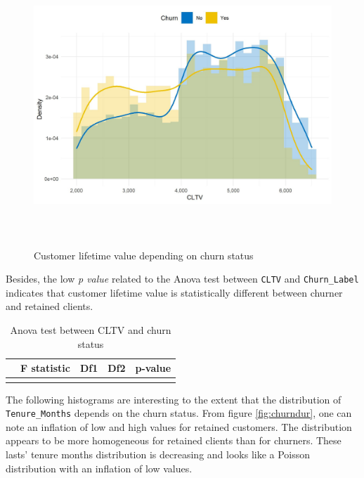 \documentclass[
]{book}
\begin{document}
\begin{figure}

{\centering \includegraphics[width=400pt,height=300pt]{./imgs/cltv_churn_plot} 

}

\caption{Customer lifetime value depending on churn status}\label{fig:cltvchurn}
\end{figure}

Besides, the low \emph{p value} related to the Anova test between \texttt{CLTV} and \texttt{Churn\_Label} indicates that customer lifetime value is statistically different between churner and retained clients.

\begin{table}[H]

\caption{\label{tab:aovcltvchurn}Anova test between CLTV and churn status}
\centering
\begin{tabular}[t]{lrrrl}
\toprule
  & F statistic & Df1 & Df2 & p-value\\
\midrule
\cellcolor{gray!6}{Churn\_Label} & \cellcolor{gray!6}{117.57} & \cellcolor{gray!6}{1} & \cellcolor{gray!6}{7030} & \cellcolor{gray!6}{3.5e-27}\\
\bottomrule
\end{tabular}
\end{table}

The following histograms are interesting to the extent that the distribution of \texttt{Tenure\_Months} depends on the churn status. From figure \ref{fig:churndur}, one can note an inflation of low and high values for retained customers. The distribution appears to be more homogeneous for retained clients than for churners. These lasts' tenure months distribution is decreasing and looks like a Poisson distribution with an inflation of low values.
\end{document}
